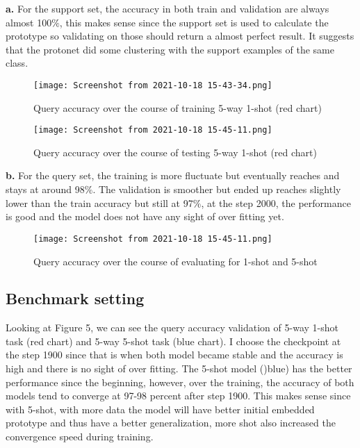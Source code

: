 \documentclass[]{article}
\begin{document}
	\textbf{a.} 
	For the support set, the accuracy in both train and validation are always almost 100$\%$, this makes sense since the support set is used to calculate the prototype so validating on those should return a almost perfect result. It suggests that the protonet did some clustering with the support examples of the same class.\\
	
	\begin{center} 
		\begin{figure}[H]
			\centering
			\texttt{[image: Screenshot from 2021-10-18 15-43-34.png]}
			\caption{Query accuracy over the course of training 5-way 1-shot (red chart)}
		\end{figure}
	\end{center}
	
	\begin{center} 
		\begin{figure}[H]
			\centering
			\texttt{[image: Screenshot from 2021-10-18 15-45-11.png]}
			\caption{Query accuracy over the course of testing 5-way 1-shot (red chart)}
		\end{figure}
	\end{center}
	
	\textbf{b.} 
	For the query set, the training is more fluctuate but eventually reaches and stays at around 98$\%$. The validation is smoother but ended up reaches slightly lower than the train accuracy but still at 97$\%$, at the step 2000, the performance is good and the model does not have any sight of over fitting yet.
	\begin{center} 
		\begin{figure}[H]
			\centering
			\texttt{[image: Screenshot from 2021-10-18 15-45-11.png]}
			\caption{Query accuracy over the course of evaluating for 1-shot and 5-shot}
		\end{figure}
	\end{center}
	\subsection{Benchmark setting}
	Looking at Figure 5, we can see the query accuracy validation of 5-way 1-shot task (red chart) and 5-way 5-shot task (blue chart). I choose the checkpoint at the step 1900 since that is when both model became stable and the accuracy is high and there is no sight of over fitting. The 5-shot model ()blue) has the better performance since the beginning, however, over the training, the accuracy of both models tend to converge at 97-98 percent after step 1900. This makes sense since with 5-shot, with more data the model will have better initial embedded prototype and thus have a better generalization, more shot also increased the convergence speed during training. \\
	
\end{document}
